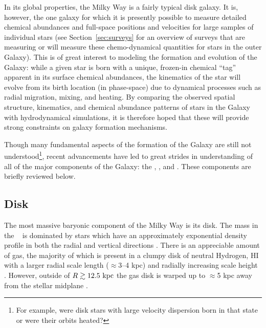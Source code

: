 In its global properties, the Milky Way is a fairly typical disk galaxy. It is, however, the one galaxy for which it is presently possible to measure detailed chemical abundances and full-space positions and velocities for large samples of individual stars (see Section~\ref{sec:surveys} for an overview of surveys that are measuring or will measure these chemo-dynamical quantities for stars in the outer Galaxy). This is of great interest to modeling the formation and evolution of the Galaxy: while a given star is born with a unique, frozen-in chemical ``tag'' apparent in its surface chemical abundances, the kinematics of the star will evolve from its birth location (in phase-space) due to dynamical processes such as radial migration, mixing, and heating. By comparing the observed spatial structure, kinematics, and chemical abundance patterns of stars in the Galaxy with hydrodynamical simulations, it is therefore hoped that these will provide strong constraints on galaxy formation mechanisms. 

Though many fundamental aspects of the formation of the Galaxy are still not understood\footnote{For example, were disk stars with large velocity dispersion born in that state or were their orbits heated?}, recent advancements have led to great strides in understanding of all of the major components of the Galaxy: the \mwdisk, \mwbulge, and \mwhalo. These components are briefly reviewed below.

\subsection{Disk}

The most massive baryonic component of the Milky Way is its disk. The mass in the \mwdisk\ \citep[$M_d \approx 5 \times 10^{10}~\msun$;][]{mcmillan11} is dominated by stars which have an approximately exponential density profile in both the radial and vertical directions \citep[with scale lengths of $\approx$2--3 kpc and $\approx$250--800 pc, respectively, from thin to thick disk;][]{ojha01, juric08, mcmillan11, bovy12-spatialMAP}. There is an appreciable amount of gas, the majority of which is present in a clumpy disk of neutral Hydrogen, HI \citep[$M_{\rm HI} \approx 8 \times 10^9~\msun$;][]{kalberla09} with a larger radial scale length ($\approx$3--4 kpc) and radially increasing scale height \citep[$\approx$100 pc at $R=8~\kpc$ to $\approx$1 kpc at $R=25~\kpc$;][]{wouterloot90, merrifield92}. However, outside of $R \gtrsim 12.5~\mathrm{kpc}$ the gas disk is warped up to $\approx$5 kpc away from the stellar midplane \citep{henderson82, kalberla07}. 

